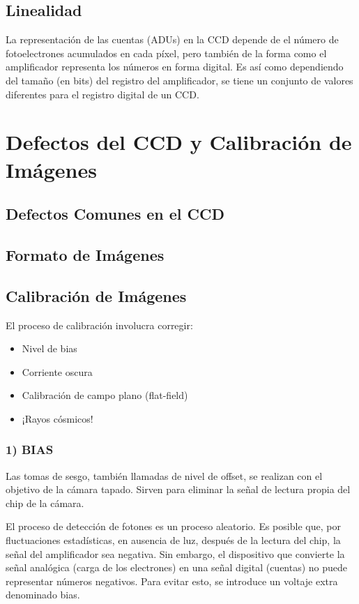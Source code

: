 \documentclass{article}
\begin{document}
\subsection{Linealidad}
La representación de las cuentas (ADUs) en la CCD depende de el número de fotoelectrones acumulados en cada píxel, pero también de la forma como el amplificador representa los números en forma digital. Es así como dependiendo del tamaño (en bits) del registro del amplificador, se tiene un conjunto de valores diferentes para el registro digital de un CCD.

\section{Defectos del CCD y Calibración de Imágenes}

\subsection{Defectos Comunes en el CCD}


\subsection{Formato de Imágenes}


\subsection{Calibración de Imágenes}
El proceso de calibración involucra corregir:
\begin{itemize}
    \item Nivel de bias
    \item Corriente oscura
    \item Calibración de campo plano (flat-field)
    \item ¡Rayos cósmicos!
\end{itemize}


\subsubsection{1) BIAS}
Las tomas de sesgo, también llamadas de nivel de offset, se realizan con el objetivo de la cámara tapado. Sirven para eliminar la señal de lectura propia del chip de la cámara.

El proceso de detección de fotones es un proceso aleatorio. Es posible que, por fluctuaciones estadísticas, en ausencia de luz, después de la lectura del chip, la señal del amplificador sea negativa. Sin embargo, el dispositivo que convierte la señal analógica (carga de los electrones) en una señal digital (cuentas) no puede representar números negativos. Para evitar esto, se introduce un voltaje extra denominado bias.
\end{document}

